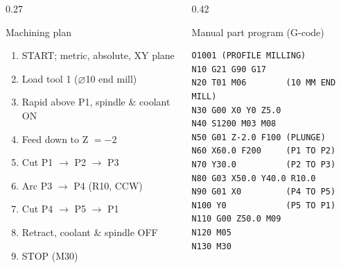 \documentclass[aspectratio=169]{beamer}
\begin{document}
	\begin{frame}{}

		\vspace*{0.05cm}

		\begin{columns}[T,onlytextwidth]


			\begin{column}{0.27\textwidth}

				\begin{block}{Machining plan}
					\scriptsize
					\begin{enumerate}
						\item START; metric, absolute, XY plane
						\item Load tool 1 ($\varnothing$10 end mill)
						\item Rapid above P1, spindle \& coolant ON
						\item Feed down to Z $=-2$
						\item Cut P1 $\to$ P2 $\to$ P3
						\item Arc P3 $\to$ P4 (R10, CCW)
						\item Cut P4 $\to$ P5 $\to$ P1
						\item Retract, coolant \& spindle OFF
						\item STOP (M30)
					\end{enumerate}
				\end{block}

			\end{column}


			\hspace*{0.3cm}
			\begin{column}{0.42\textwidth}

				\begin{block}{Manual part program (G-code)}

\begin{lstlisting}[style=gstyle,basicstyle=\ttfamily\scriptsize]
O1001 (PROFILE MILLING)
N10 G21 G90 G17
N20 T01 M06        (10 MM END MILL)
N30 G00 X0 Y0 Z5.0
N40 S1200 M03 M08
N50 G01 Z-2.0 F100 (PLUNGE)
N60 X60.0 F200     (P1 TO P2)
N70 Y30.0          (P2 TO P3)
N80 G03 X50.0 Y40.0 R10.0
N90 G01 X0         (P4 TO P5)
N100 Y0            (P5 TO P1)
N110 G00 Z50.0 M09
N120 M05
N130 M30
\end{lstlisting}


\end{block}
\end{column}
\end{columns}
\end{frame}
\end{document}
